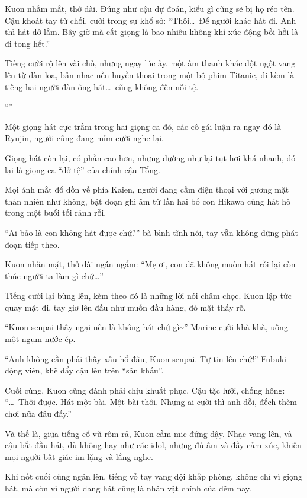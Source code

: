 \documentclass[../main.tex]{subfiles}
\begin{document}
Kuon nhắm mắt, thở dài. Đúng như cậu dự đoán, kiểu gì cũng sẽ bị họ réo tên. Cậu khoát tay từ chối, cười trong sự khổ sở: ``Thôi\dots\ Để người khác hát đi. Anh thì hát dở lắm. Bây giờ mà cất giọng là bao nhiêu không khí xúc động bồi hồi là đi tong hết.''

Tiếng cười rộ lên vài chỗ, nhưng ngay lúc ấy, một âm thanh khác đột ngột vang lên từ dàn loa, bản nhạc nền huyền thoại trong một bộ phim Titanic, đi kèm là tiếng hai người đàn ông hát\dots\ cũng không đến nỗi tệ.

``''

Một giọng hát cực trầm trong hai giọng ca đó, các cô gái luận ra ngay đó là Ryujin, người cũng đang mỉm cười nghe lại.

Giọng hát còn lại, có phần cao hơn, nhưng dường như lại tụt hơi khá nhanh, đó lại là giọng ca ``dở tệ'' của chính cậu Tổng.

Mọi ánh mắt đổ dồn về phía Kaien, người đang cầm điện thoại với gương mặt thản nhiên như không, bật đoạn ghi âm từ lần hai bố con Hikawa cùng hát hò trong một buổi tối rảnh rỗi.

``Ai bảo là con không hát được chứ?'' bà bình tĩnh nói, tay vẫn không dừng phát đoạn tiếp theo.

Kuon nhăn mặt, thở dài ngán ngẩm: ``Mẹ ơi, con đã không muốn hát rồi lại còn thúc người ta làm gì chứ\dots''

Tiếng cười lại bùng lên, kèm theo đó là những lời nói châm chọc. Kuon lập tức quay mặt đi, tay giơ lên đầu như muốn đầu hàng, đỏ mặt thấy rõ.

``Kuon-senpai thấy ngại nên là không hát chứ gì\~{}'' Marine cười khà khà, uống một ngụm nước ép.

``Anh không cần phải thấy xấu hổ đâu, Kuon-senpai. Tự tin lên chứ!'' Fubuki động viên, khẽ đẩy cậu lên trên ``sân khấu''.

Cuối cùng, Kuon cũng đành phải chịu khuất phục. Cậu tặc lưỡi, chống hông: ``\dots\ Thôi được. Hát một bài. Một bài thôi. Nhưng ai cười thì anh dỗi, đếch thèm chơi nữa đâu đấy.''

Và thế là, giữa tiếng cổ vũ rôm rả, Kuon cầm mic đứng dậy. Nhạc vang lên, và cậu bắt đầu hát, dù không hay như các idol, nhưng đủ ấm và đầy cảm xúc, khiến mọi người bất giác im lặng và lắng nghe.

Khi nốt cuối cùng ngân lên, tiếng vỗ tay vang dội khắp phòng, không chỉ vì giọng hát, mà còn vì người đang hát cũng là nhân vật chính của đêm nay.
\end{document}
